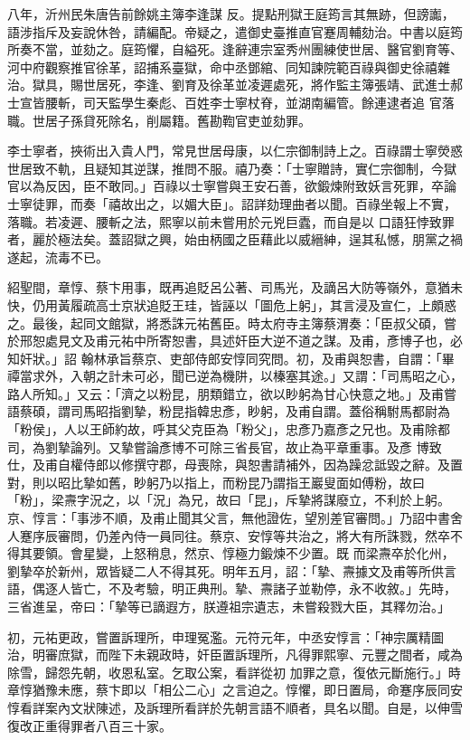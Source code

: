 \begin{pinyinscope}
 八年，沂州民朱唐告前餘姚主簿李逢謀
 反。提點刑獄王庭筠言其無跡，但謗讟，語涉指斥及妄說休咎，請編配。帝疑之，遣御史臺推直官蹇周輔劾治。中書以庭筠所奏不當，並劾之。庭筠懼，自縊死。逢辭連宗室秀州團練使世居、醫官劉育等、河中府觀察推官徐革，詔捕系臺獄，命中丞鄧綰、同知諫院範百祿與御史徐禧雜治。獄具，賜世居死，李逢、劉育及徐革並凌遲處死，將作監主簿張靖、武進士郝士宣皆腰斬，司天監學生秦彪、百姓李士寧杖脊，並湖南編管。餘連逮者追
 官落職。世居子孫貸死除名，削屬籍。舊勘鞫官吏並劾罪。



 李士寧者，挾術出入貴人門，常見世居母康，以仁宗御制詩上之。百祿謂士寧熒惑世居致不軌，且疑知其逆謀，推問不服。禧乃奏：「士寧贈詩，實仁宗御制，今獄官以為反因，臣不敢同。」百祿以士寧嘗與王安石善，欲鍛煉附致妖言死罪，卒論士寧徒罪，而奏「禧故出之，以媚大臣」。詔詳劾理曲者以聞。百祿坐報上不實，落職。若凌遲、腰斬之法，熙寧以前未嘗用於元兇巨蠹，而自是以
 口語狂悖致罪者，麗於極法矣。蓋詔獄之興，始由柄國之臣藉此以威縉紳，逞其私憾，朋黨之禍遂起，流毒不已。



 紹聖間，章惇、蔡卞用事，既再追貶呂公著、司馬光，及謫呂大防等嶺外，意猶未快，仍用黃履疏高士京狀追貶王珪，皆誣以「圖危上躬」，其言浸及宣仁，上頗惑之。最後，起同文館獄，將悉誅元祐舊臣。時太府寺主簿蔡渭奏：「臣叔父碩，嘗於邢恕處見文及甫元祐中所寄恕書，具述奸臣大逆不道之謀。及甫，彥博子也，必知奸狀。」詔
 翰林承旨蔡京、吏部侍郎安惇同究問。初，及甫與恕書，自謂：「畢禫當求外，入朝之計未可必，聞已逆為機阱，以榛塞其途。」又謂：「司馬昭之心，路人所知。」又云：「濟之以粉昆，朋類錯立，欲以眇躬為甘心快意之地。」及甫嘗語蔡碩，謂司馬昭指劉摯，粉昆指韓忠彥，眇躬，及甫自謂。蓋俗稱駙馬都尉為「粉侯」，人以王師約故，呼其父克臣為「粉父」，忠彥乃嘉彥之兄也。及甫除都司，為劉摯論列。又摯嘗論彥博不可除三省長官，故止為平章重事。及彥
 博致仕，及甫自權侍郎以修撰守郡，母喪除，與恕書請補外，因為躁忿詆毀之辭。及置對，則以昭比摯如舊，眇躬乃以指上，而粉昆乃謂指王巖叟面如傅粉，故曰「粉」，梁燾字況之，以「況」為兄，故曰「昆」，斥摯將謀廢立，不利於上躬。京、惇言：「事涉不順，及甫止聞其父言，無他證佐，望別差官審問。」乃詔中書舍人蹇序辰審問，仍差內侍一員同往。蔡京、安惇等共治之，將大有所誅戮，然卒不得其要領。會星變，上怒稍息，然京、惇極力鍛煉不少置。既
 而梁燾卒於化州，劉摯卒於新州，眾皆疑二人不得其死。明年五月，詔：「摯、燾據文及甫等所供言語，偶逐人皆亡，不及考驗，明正典刑。摯、燾諸子並勒停，永不收敘。」先時，三省進呈，帝曰：「摯等已謫遐方，朕遵祖宗遺志，未嘗殺戮大臣，其釋勿治。」



 初，元祐更政，嘗置訴理所，申理冤濫。元符元年，中丞安惇言：「神宗厲精圖治，明審庶獄，而陛下未親政時，奸臣置訴理所，凡得罪熙寧、元豐之間者，咸為除雪，歸怨先朝，收恩私室。乞取公案，看詳從初
 加罪之意，復依元斷施行。」時章惇猶豫未應，蔡卞即以「相公二心」之言迫之。惇懼，即日置局，命蹇序辰同安惇看詳案內文狀陳述，及訴理所看詳於先朝言語不順者，具名以聞。自是，以伸雪復改正重得罪者八百三十家。




\end{pinyinscope}
